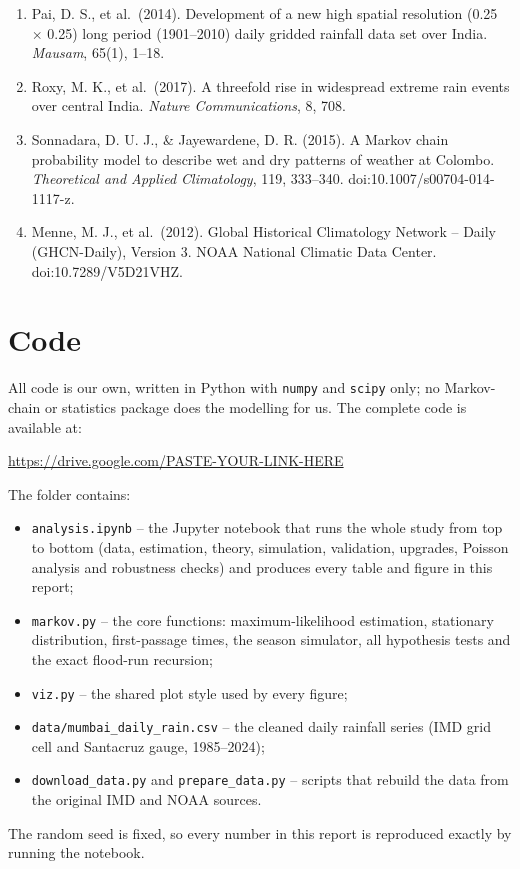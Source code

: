 \documentclass[11pt,a4paper]{article}
\begin{document}
\begin{enumerate}
\item

  Pai, D. S., et al.~(2014). Development of a new high spatial resolution (0.25\textdegree{} $\times$ 0.25\textdegree{}) long period (1901--2010) daily gridded rainfall data set over India. \emph{Mausam}, 65(1), 1--18.

\item

  Roxy, M. K., et al.~(2017). A threefold rise in widespread extreme rain events over central India. \emph{Nature Communications}, 8, 708.

\item

  Sonnadara, D. U. J., \& Jayewardene, D. R. (2015). A Markov chain probability model to describe wet and dry patterns of weather at Colombo. \emph{Theoretical and Applied Climatology}, 119, 333--340. doi:10.1007/s00704-014-1117-z.

\item

  Menne, M. J., et al.~(2012). Global Historical Climatology Network -- Daily (GHCN-Daily), Version 3. NOAA National Climatic Data Center. doi:10.7289/V5D21VHZ.

\end{enumerate}


\appendix
\section{Code}

All code is our own, written in Python with \texttt{numpy} and \texttt{scipy} only; no Markov-chain
or statistics package does the modelling for us. The complete code is available at:

\begin{center}
\url{https://drive.google.com/PASTE-YOUR-LINK-HERE}
\end{center}

The folder contains:
\begin{itemize}
  \item \texttt{analysis.ipynb} -- the Jupyter notebook that runs the whole study from top to bottom
        (data, estimation, theory, simulation, validation, upgrades, Poisson analysis and robustness
        checks) and produces every table and figure in this report;
  \item \texttt{markov.py} -- the core functions: maximum-likelihood estimation, stationary
        distribution, first-passage times, the season simulator, all hypothesis tests and the exact
        flood-run recursion;
  \item \texttt{viz.py} -- the shared plot style used by every figure;
  \item \texttt{data/mumbai\_daily\_rain.csv} -- the cleaned daily rainfall series (IMD grid cell and
        Santacruz gauge, 1985--2024);
  \item \texttt{download\_data.py} and \texttt{prepare\_data.py} -- scripts that rebuild the data
        from the original IMD and NOAA sources.
\end{itemize}
The random seed is fixed, so every number in this report is reproduced exactly by running the notebook.
\end{document}

